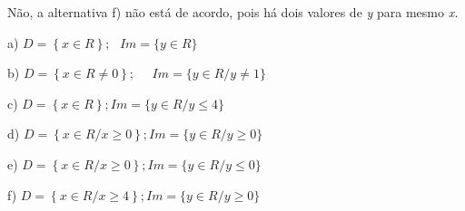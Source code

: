 \begin{respostas}{2}
\ansitem{} Não, a alternativa f) não está de acordo, pois há dois valores de \textit{y} para mesmo \textit{x.}

\ansitem{} a)  \( D= \left\{ x \in R \right\} ; ~~~ Im= \{ y \in R \}  \)

b)  \( D= \left\{ x \in R \neq 0 \right\} ;~~~~~~ Im= \{ y \in  R / y \neq 1 \}  \) 

c)  \( D= \left\{ x \in R \right\} ; Im= \{ y \in R / y \leq 4 \}  \) 

d)  \( D= \left\{ x \in R/x \geq 0 \right\} ; Im= \{ y \in R/y \geq 0 \}  \) 

e)  \( D= \left\{ x \in R/x \geq 0 \right\} ; Im= \{ y \in R/y \leq 0 \}  \) 

f)  \( D= \left\{ x \in R/x \geq 4 \right\} ; Im= \{ y \in R/y \geq 0 \}  \) 
\end{respostas}

